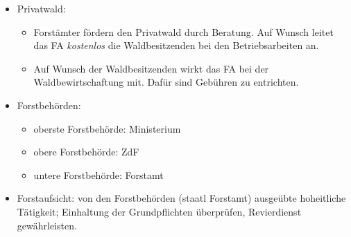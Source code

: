 \documentclass{article}
\begin{document}
\begin{itemize}
\begin{itemize}
	 \end{itemize}	


   \item Privatwald: 

    \begin{itemize} 
	
	  \item Forstämter fördern den Privatwald durch Beratung. Auf Wunsch leitet das FA \textit{kostenlos} die Waldbesitzenden bei den Betriebsarbeiten an.

      \item Auf Wunsch der Waldbesitzenden wirkt das FA bei der Waldbewirtschaftung mit. Dafür sind Gebühren zu entrichten.

    \end{itemize}


   \item Forstbehörden: 

    \begin{itemize} 
	
	\item oberste Forstbehörde: Ministerium
	
	\item obere Forstbehörde: ZdF
	
	\item untere Forstbehörde: Forstamt
	
    \end{itemize}


   \item Forstaufsicht: von den Forstbehörden (staatl Forstamt) ausgeübte hoheitliche Tätigkeit; Einhaltung der Grundpflichten überprüfen, Revierdienst gewährleisten.


\end{itemize}


\end{document}
